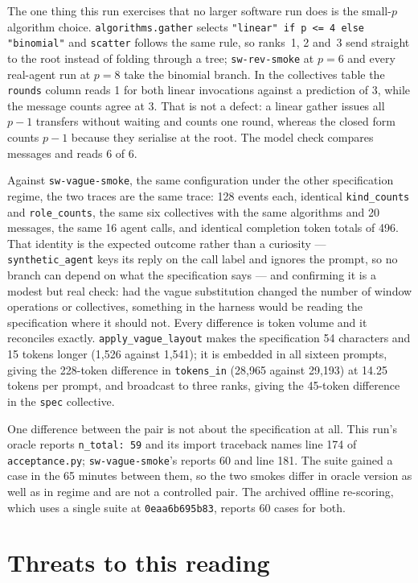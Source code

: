 \documentclass[11pt]{article}
\begin{document}
The one thing this run exercises that no larger software run does is the small-$p$ algorithm
choice. \texttt{algorithms.gather} selects \texttt{"linear" if p <= 4 else "binomial"} and
\texttt{scatter} follows the same rule, so ranks~1, 2 and~3 send straight to the root instead
of folding through a tree; \texttt{sw-rev-smoke} at $p = 6$ and every real-agent run at $p = 8$
take the binomial branch. In the collectives table the \texttt{rounds} column reads 1 for both
linear invocations against a prediction of 3, while the message counts agree at 3. That is not
a defect: a linear gather issues all $p-1$ transfers without waiting and counts one round,
whereas the closed form counts $p-1$ because they serialise at the root. The model check
compares messages and reads 6 of 6.

Against \texttt{sw-vague-smoke}, the same configuration under the other specification regime,
the two traces are the same trace: 128 events each, identical \texttt{kind\_counts} and
\texttt{role\_counts}, the same six collectives with the same algorithms and 20 messages, the
same 16 agent calls, and identical completion token totals of 496. That identity is the
expected outcome rather than a curiosity --- \texttt{synthetic\_agent} keys its reply on the
call label and ignores the prompt, so no branch can depend on what the specification says ---
and confirming it is a modest but real check: had the vague substitution changed the number of
window operations or collectives, something in the harness would be reading the specification
where it should not. Every difference is token volume and it reconciles exactly.
\texttt{apply\_vague\_layout} makes the specification 54 characters and 15 tokens longer
(1{,}526 against 1{,}541); it is embedded in all sixteen prompts, giving the 228-token
difference in \texttt{tokens\_in} (28{,}965 against 29{,}193) at 14.25 tokens per prompt, and
broadcast to three ranks, giving the 45-token difference in the \texttt{spec} collective.

One difference between the pair is not about the specification at all. This run's oracle
reports \texttt{n\_total: 59} and its import traceback names line 174 of
\texttt{acceptance.py}; \texttt{sw-vague-smoke}'s reports 60 and line 181. The suite gained a
case in the 65 minutes between them, so the two smokes differ in oracle version as well as in
regime and are not a controlled pair. The archived offline re-scoring, which uses a single
suite at \texttt{0eaa6b695b83}, reports 60 cases for both.

\section{Threats to this reading}
\end{document}
